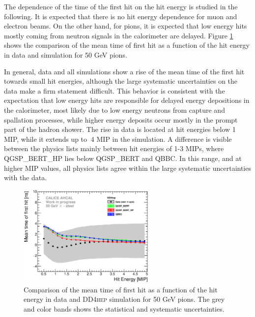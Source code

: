 \documentclass{JINST}
\newcommand\ddhep{\textsc{DD4hep}\xspace}
\begin{document}
The dependence of the time of the first hit on the hit energy is studied in the following. It is expected that there is no hit energy dependence for muon and electron beams. On the other hand, for pions, it is expected that low energy hits mostly coming from neutron signals in the calorimeter are delayed. Figure \ref{fig:Energy_SimData_50GeV} shows the comparison of the mean time of first hit as a function of the hit energy in data and simulation for 50 GeV pions.

In general, data and all simulations show a rise of the mean time of the first hit towards small hit energies, although the large systematic uncertainties on the data make a firm statement difficult. This behavior is consistent with the expectation that low energy hits are responsible for delayed energy depositions in the calorimeter, most likely due to low energy neutrons from capture and spallation processes, while higher energy deposits occur mostly in the prompt part of the hadron shower. The rise in data is located at hit energies below 1 MIP, while it extends up to $~4$ MIP in the simulation. A difference is visible between the physics lists mainly between hit energies of 1-3 MIPs, where QGSP\_BERT\_HP lies below QGSP\_BERT and QBBC. In this range, and at higher MIP values, all physics lists agree within the large systematic uncertainties with the data.

\begin{figure}[htbp!]
  \centering
  \includegraphics[width=0.6\textwidth]{fig/Time_Energy_50GeV_DD4hep.eps}
  \caption{Comparison of the mean time of first hit as a function of the hit energy in data and \ddhep simulation for 50 GeV pions. The grey and color bands shows the statistical and systematic uncertainties.}
  \label{fig:Energy_SimData_50GeV}
\end{figure}
\end{document}
